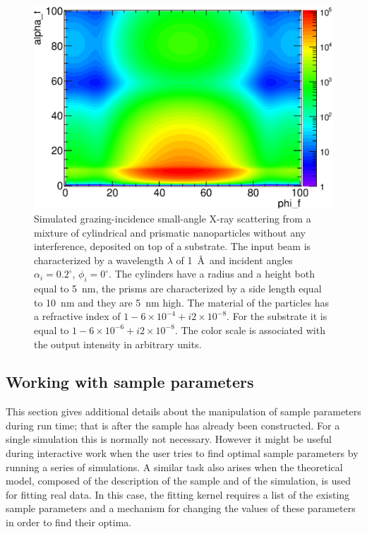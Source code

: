 \begin{figure}[htbp]
  \begin{center}
   \includegraphics[clip=true, width=120mm]{fig/gisasmap/Manual_ex1.eps}
  \end{center}
  \caption[Example 1: Simulated grazing-incidence small-angle X-ray scattering from a mixture of
cylindrical and prismatic nanoparticles without any interference, deposited on top
of a substrate]{Simulated grazing-incidence small-angle X-ray scattering from a mixture of
cylindrical and prismatic nanoparticles without any interference, deposited on top
of a substrate. The input beam is characterized by a wavelength
$\lambda$ of 1~\AA\ and incident angles $\alpha_i=0.2^{\circ}$, $\phi_i=0^{\circ}$. The
cylinders have a radius and a height both equal to 5~nm, the prisms
are characterized by a side length equal to 10~nm and they are 5~nm high. The
material of the particles has a refractive index of $1-6\times 10^{-4}+i2\times 10^{-8}$. For the substrate
it is equal to $1-6\times 10^{-6} +i2\times 10^{-8} $. The color scale
is associated with the output intensity in arbitrary units. }
\label{fig:output_ex1}
\end{figure}


\subsection{Working with sample parameters}


This section gives additional details about the manipulation of sample parameters
during run time; that is after the sample has already been constructed. 
For a single simulation this is normally not necessary. However it might be useful
during interactive work when the user tries to find optimal sample parameters by
running a series of simulations.
A similar task also arises when the theoretical model, composed of the
description of the sample and of the simulation, is used for fitting real data.
In this case, the fitting kernel requires a list of the existing sample parameters
and a mechanism for changing the values of these parameters in order to find 
their optima.

